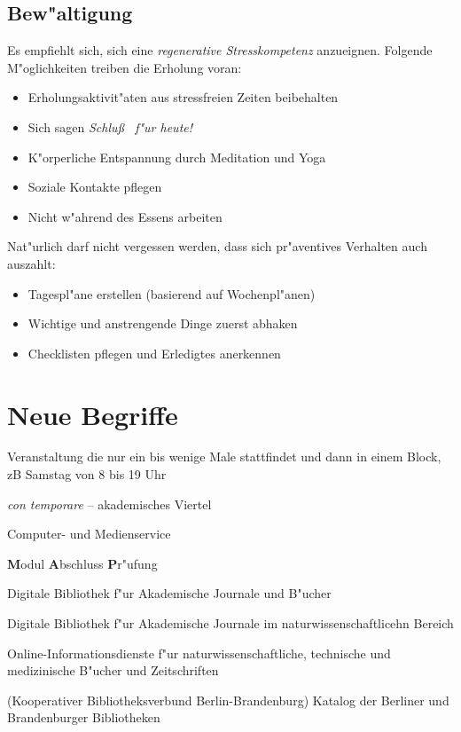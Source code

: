 \documentclass[]{scrartcl}
\begin{document}
\subsection{Bew"altigung}

Es empfiehlt sich, sich eine \emph{regenerative Stresskompetenz} anzueignen. Folgende M"oglichkeiten treiben die Erholung voran: 

\begin{itemize}
    \item Erholungsaktivit"aten aus stressfreien Zeiten beibehalten
    \item Sich sagen \emph{Schlu\ss~ f"ur heute!}
    \item K"orperliche Entspannung durch Meditation und Yoga
    \item Soziale Kontakte pflegen
    \item Nicht w"ahrend des Essens arbeiten
  \end{itemize}

Nat"urlich darf nicht vergessen werden, dass sich pr"aventives Verhalten auch auszahlt:

\begin{itemize}
    \item Tagespl"ane erstellen (basierend auf Wochenpl"anen)
    \item Wichtige und anstrengende Dinge zuerst abhaken
    \item Checklisten pflegen und Erledigtes anerkennen
  \end{itemize}


\section{Neue Begriffe}

\begin{description}[leftmargin=!,labelwidth=\widthof{\bfseries Blockveranstaltung}]
  \item[Blockveranstaltung] Veranstaltung die nur ein bis wenige Male stattfindet und dann in einem Block, zB Samstag von 8 bis 19 Uhr
  \item[ct] \emph{con temporare} -- akademisches Viertel
  \item[CMS] Computer- und Medienservice
  \item[MAP] \textbf{M}odul \textbf{A}bschluss \textbf{P}r"ufung
  \item[jstor] Digitale Bibliothek f"ur Akademische Journale und B"ucher
  \item[Wiley] Digitale Bibliothek f"ur Akademische Journale im naturwissenschaftlicehn Bereich
  \item[Springerlink] Online-Informationsdienste f"ur naturwissenschaftliche, technische und medizinische B"ucher und Zeitschriften
  \item[KOBV] (Kooperativer Bibliotheksverbund Berlin-Brandenburg) Katalog der Berliner und Brandenburger Bibliotheken
\end{description}
\end{document}
